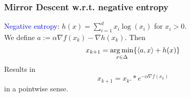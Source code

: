 \documentclass{beamer}
\begin{document}

\begin{frame}
  \frametitle{Mirror Descent w.r.t. negative entropy}
    \textcolor{blue}{Negative entropy}: $h(x) = \sum_{i=1}^{d} x_i \log(x_i)$ for $ x_i > 0$. \\
    We define $a := \alpha \nabla f(x_k) - \nabla h(x_k)$. Then
    \begin{equation}
      x_{k+1} = \operatorname*{arg\,min}_{x \in \Delta} \{ \langle a, x \rangle + h(x)\}
    \end{equation}
    Results in
    \begin{equation}
      x_{k+1} = x_k .* e^{- \alpha \nabla f(x_k)}
    \end{equation}
    in a pointwise sense.
\end{frame}



\end{document}
